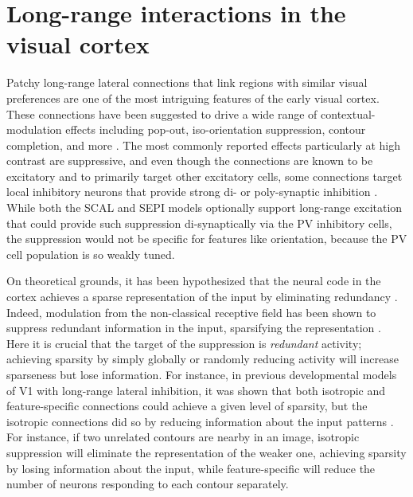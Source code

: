 \chapter{Long-range interactions in the visual cortex}

Patchy long-range lateral connections that link regions with similar
visual preferences are one of the most intriguing features of the
early visual cortex. These connections have been suggested to drive a
wide range of contextual-modulation effects including pop-out,
iso-orientation suppression, contour completion, and more
\citep{Gilbert1983, Hirsch1991, McGuire1991, Grinvald1994,
  Fitzpatrick2000, Hupe2001, Stettler2002}. The most commonly reported
effects particularly at high contrast are suppressive, and even though
the connections are known to be excitatory and to primarily target
other excitatory cells, some connections target local inhibitory
neurons that provide strong di- or poly-synaptic inhibition
\citep{Hirsch1991,Weliky1995}.  While both the SCAL and SEPI models
optionally support long-range excitation that could provide such
suppression di-synaptically via the PV inhibitory cells, the
suppression would not be specific for features like orientation,
because the PV cell population is so weakly tuned.

On theoretical grounds, it has been hypothesized that the neural code
in the cortex achieves a sparse representation of the input by
eliminating redundancy \citep{barlow:comneuron89,Olshausen1996}.
Indeed, modulation from the non-classical receptive field has been
shown to suppress redundant information in the input, sparsifying the
representation \citep{Vinje2000}. Here it is crucial that the target
of the suppression is \emph{redundant} activity; achieving sparsity by
simply globally or randomly reducing activity will increase sparseness
but lose information.  For instance, in previous developmental models
of V1 with long-range lateral inhibition, it was shown that both
isotropic and feature-specific connections could achieve a given level
of sparsity, but the isotropic connections did so by reducing
information about the input patterns \citep{Miikkulainen2005}.  For
instance, if two unrelated contours are nearby in an image, isotropic
suppression will eliminate the representation of the weaker one,
achieving sparsity by losing information about the input, while
feature-specific will reduce the number of neurons responding to each
contour separately.

